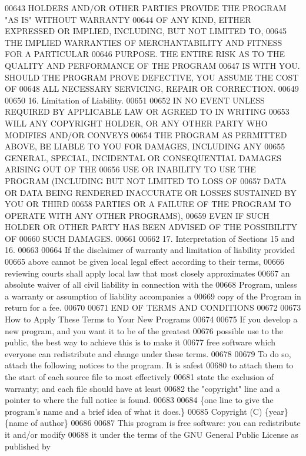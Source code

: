 \begin{DoxyCode}
00643 HOLDERS AND/OR OTHER PARTIES PROVIDE THE PROGRAM "AS IS" WITHOUT WARRANTY
00644 OF ANY KIND, EITHER EXPRESSED OR IMPLIED, INCLUDING, BUT NOT LIMITED TO,
00645 THE IMPLIED WARRANTIES OF MERCHANTABILITY AND FITNESS FOR A PARTICULAR
00646 PURPOSE.  THE ENTIRE RISK AS TO THE QUALITY AND PERFORMANCE OF THE PROGRAM
00647 IS WITH YOU.  SHOULD THE PROGRAM PROVE DEFECTIVE, YOU ASSUME THE COST OF
00648 ALL NECESSARY SERVICING, REPAIR OR CORRECTION.
00649 
00650   16. Limitation of Liability.
00651 
00652   IN NO EVENT UNLESS REQUIRED BY APPLICABLE LAW OR AGREED TO IN WRITING
00653 WILL ANY COPYRIGHT HOLDER, OR ANY OTHER PARTY WHO MODIFIES AND/OR CONVEYS
00654 THE PROGRAM AS PERMITTED ABOVE, BE LIABLE TO YOU FOR DAMAGES, INCLUDING ANY
00655 GENERAL, SPECIAL, INCIDENTAL OR CONSEQUENTIAL DAMAGES ARISING OUT OF THE
00656 USE OR INABILITY TO USE THE PROGRAM (INCLUDING BUT NOT LIMITED TO LOSS OF
00657 DATA OR DATA BEING RENDERED INACCURATE OR LOSSES SUSTAINED BY YOU OR THIRD
00658 PARTIES OR A FAILURE OF THE PROGRAM TO OPERATE WITH ANY OTHER PROGRAMS),
00659 EVEN IF SUCH HOLDER OR OTHER PARTY HAS BEEN ADVISED OF THE POSSIBILITY OF
00660 SUCH DAMAGES.
00661 
00662   17. Interpretation of Sections 15 and 16.
00663 
00664   If the disclaimer of warranty and limitation of liability provided
00665 above cannot be given local legal effect according to their terms,
00666 reviewing courts shall apply local law that most closely approximates
00667 an absolute waiver of all civil liability in connection with the
00668 Program, unless a warranty or assumption of liability accompanies a
00669 copy of the Program in return for a fee.
00670 
00671                      END OF TERMS AND CONDITIONS
00672 
00673             How to Apply These Terms to Your New Programs
00674 
00675   If you develop a new program, and you want it to be of the greatest
00676 possible use to the public, the best way to achieve this is to make it
00677 free software which everyone can redistribute and change under these terms.
00678 
00679   To do so, attach the following notices to the program.  It is safest
00680 to attach them to the start of each source file to most effectively
00681 state the exclusion of warranty; and each file should have at least
00682 the "copyright" line and a pointer to where the full notice is found.
00683 
00684     \{one line to give the program's name and a brief idea of what it does.\}
00685     Copyright (C) \{year\}  \{name of author\}
00686 
00687     This program is free software: you can redistribute it and/or modify
00688     it under the terms of the GNU General Public License as published by

\end{DoxyCode}
